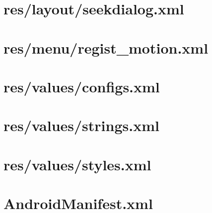\documentclass[11pt]{jreport}
\renewcommand{\slash}{/}
\begin{document}
    \section{res\slash layout\slash seekdialog.xml}
    

    \section{res\slash menu\slash regist\_motion.xml}
    

    \section{res\slash values\slash configs.xml}
    

    \section{res\slash values\slash strings.xml}
    

    \section{res\slash values\slash styles.xml}
    

    \section{AndroidManifest.xml}
    
\end{document}
